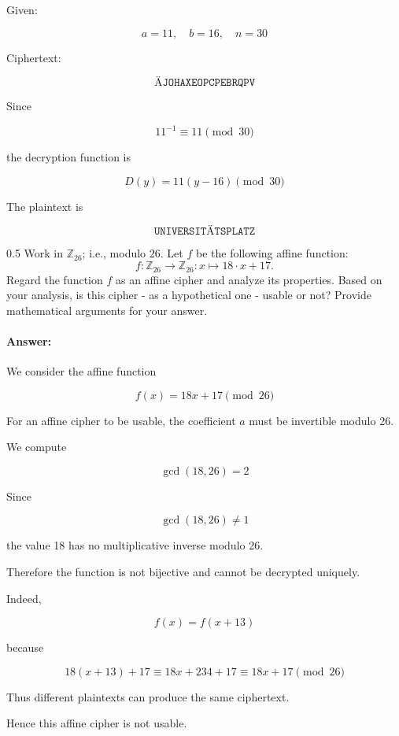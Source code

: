 \documentclass[]{scrartcl}
\newcommand{\ZZ}{\mathbb{Z}}
\newcounter{exercise}
\newcounter{qid}[section]
\newcommand{\exerciseprefix}{prefix}
\newcommand{\questiontitle}{Questions}
\newcommand{\blockid}{B2}
\newcommand{\exname}{}
\begin{document}
{Given:

\[
a=11,\quad b=16,\quad n=30
\]

Ciphertext:

\[
\texttt{ÄJOHAXEOPCPEBRQPV}
\]

Since

\[
11^{-1}\equiv 11 \pmod{30}
\]

the decryption function is

\[
D(y)=11(y-16)\pmod{30}
\]

The plaintext is

\[
\texttt{UNIVERSITÄTSPLATZ}
\]}



\renewcommand{\exerciseprefix}{PS-\blockid{}-E\theexercise: \exname-Q\theqid}
\renewcommand{\questiontitle}{\exerciseprefix{}: Mathematical properties}
\begin{exercisebox}{0.5}
Work in $\ZZ_{26}$; i.e., modulo $26$. Let $f$ be the following affine function:
\begin{equation}
    f: \ZZ_{26} \rightarrow \ZZ_{26}: x \mapsto 18 \cdot x + 17. 
\end{equation}
Regard the function $f$ as an affine cipher and analyze its properties. Based on your analysis, is this cipher - as a hypothetical one - usable or not? Provide mathematical arguments for your answer. 
\end{exercisebox}

\paragraph{Answer:} {We consider the affine function

\[
f(x)=18x+17 \pmod{26}
\]

For an affine cipher to be usable, the coefficient \(a\) must be invertible modulo 26.

We compute

\[
\gcd(18,26)=2
\]

Since

\[
\gcd(18,26)\neq1
\]

the value 18 has no multiplicative inverse modulo 26.

Therefore the function is not bijective and cannot be decrypted uniquely.

Indeed,

\[
f(x)=f(x+13)
\]

because

\[
18(x+13)+17
\equiv
18x+234+17
\equiv
18x+17
\pmod{26}
\]

Thus different plaintexts can produce the same ciphertext.

Hence this affine cipher is not usable.}
\end{document}
